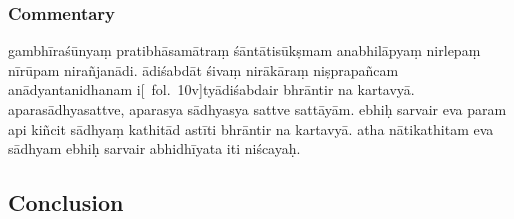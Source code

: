 \documentclass[12pt]{article}
\begin{document}
\subsubsection{Commentary}
\noindent [\EDD\ p.\ 149] gambhīraśūnyaṃ pratibhāsamātraṃ śāntātisūkṣmam anabhilāpyaṃ nirlepaṃ nīrūpam\footnoteB{
	nīrūpam] \EDD\ (\emd); nirupamaṃ \MS
} nirañjanādi.\footnoteB{
	nirañjanādi] \MS ; nirañjanaṃ \EDD
} ādiśabdāt śivaṃ nirākāraṃ niṣprapañcam anādyantanidhanam i[\MS\ fol.\ 10v]tyādiśabdair bhrāntir na kartavyā. aparasādhyasattve, aparasya sādhyasya sattve sattāyām.\footnoteB{
	sattāyām] \MS ; sattvāyā \EDD
} ebhiḥ sarvair eva param api kiñcit sādhyaṃ kathitād astīti bhrāntir na kartavyā. atha nātikathitam eva sādhyam ebhiḥ sarvair abhidhīyata iti niścayaḥ.

% 
 
\subsection{Conclusion}
\end{document}
